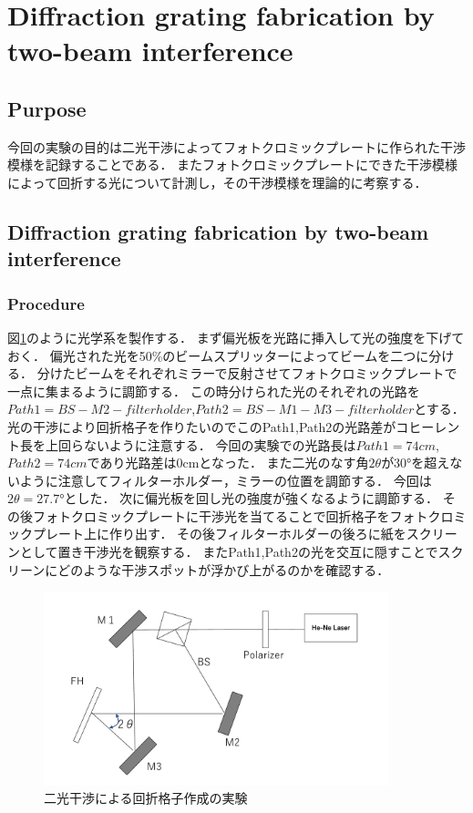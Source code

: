 \documentclass[11pt, a4paper]{jsarticle}
\begin{document}
\section{Diffraction grating fabrication by two-beam interference}
\subsection*{Purpose}
今回の実験の目的は二光干渉によってフォトクロミックプレートに作られた干渉模様を記録することである．
またフォトクロミックプレートにできた干渉模様によって回折する光について計測し，その干渉模様を理論的に考察する．
\subsection{Diffraction grating fabrication by two-beam interference}
\subsubsection{Procedure}
図\ref{fig:22}のように光学系を製作する．
まず偏光板を光路に挿入して光の強度を下げておく．
偏光された光を50\%のビームスプリッターによってビームを二つに分ける．
分けたビームをそれぞれミラーで反射させてフォトクロミックプレートで一点に集まるように調節する．
この時分けられた光のそれぞれの光路を$Path1=BS - M2 - filter holder$,$Path2=BS - M1 - M3 - filter holder$とする．
光の干渉により回折格子を作りたいのでこのPath1,Path2の光路差がコヒーレント長を上回らないように注意する．
今回の実験での光路長は$Path1=74cm$,$Path2=74cm$であり光路差は0cmとなった．
また二光のなす角$2\theta$が30°を超えないように注意してフィルターホルダー，ミラーの位置を調節する．
今回は$2\theta = 27.7°$とした．
次に偏光板を回し光の強度が強くなるように調節する．
その後フォトクロミックプレートに干渉光を当てることで回折格子をフォトクロミックプレート上に作り出す．
その後フィルターホルダーの後ろに紙をスクリーンとして置き干渉光を観察する．
またPath1,Path2の光を交互に隠すことでスクリーンにどのような干渉スポットが浮かび上がるのかを確認する．

\begin{figure}[htbp]
 \begin{center}
  \includegraphics[width=100mm]{fig22.png}
 \end{center}
 \caption{二光干渉による回折格子作成の実験}
 \label{fig:22}
\end{figure}
\end{document}

